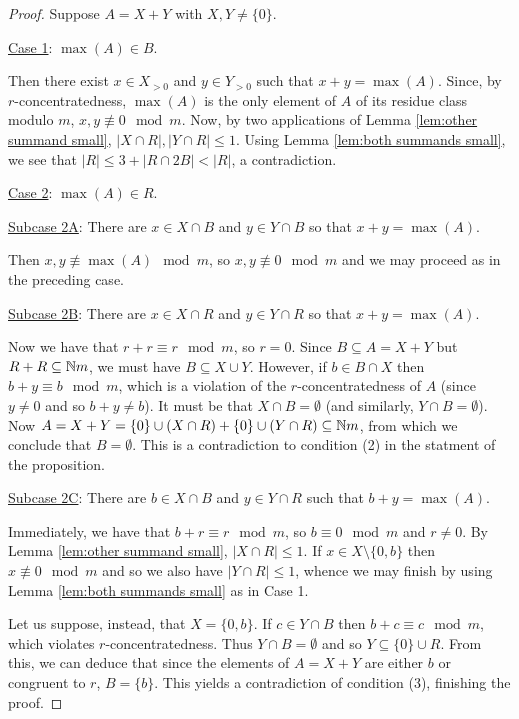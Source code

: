 \begin{proof}
Suppose $A = X + Y$ with $X,Y\neq\{0\}$.

\noindent \underline{Case 1}: $\max(A)\in B$.

Then there exist $x\in X_{>0}$ and $y\in Y_{>0}$ such that $x+y = \max(A)$.
Since, by $r$-concentratedness, $\max(A)$ is the only element of $A$ of its residue class modulo $m$, $x,y\not\equiv 0 \mod m$.
Now, by two applications of Lemma \ref{lem:other summand small}, $|X\cap R|, |Y\cap R|\le 1$.
Using Lemma \ref{lem:both summands small}, we see that $|R| \le 3 + |R\cap 2B| < |R|$, a contradiction.

\noindent \underline{Case 2}: $\max(A) \in R$.

\noindent \underline{Subcase 2A}: There are $x\in X\cap B$ and $y\in Y\cap B$ so that $x+y = \max(A)$.

Then $x,y\not\equiv \max(A) \mod m$, so $x,y\not\equiv 0 \mod m$ and we may proceed as in the preceding case.

\noindent \underline{Subcase 2B}: There are $x\in X\cap R$ and $y\in Y\cap R$ so that $x+y = \max(A)$.

Now we have that $r+r\equiv r \mod m$, so $r = 0$.
Since $B\subseteq A = X+Y$ but $R+R \subseteq \mathbb{N} m$, we must have $B \subseteq X \cup Y$.
However, if $b\in B\cap X$ then $b+y \equiv b \mod m$, which is a violation of the $r$-concentratedness of $A$ (since $y\neq 0$ and so $b+y\neq b$).
It must be that $X\cap B = \emptyset$ (and similarly, $Y\cap B = \emptyset$).
Now $A = X+Y = \{0\}\cup (X\cap R) + \{0\}\cup (Y\cap R) \subseteq \mathbb{N} m$, from which we conclude that $B = \emptyset$.
This is a contradiction to condition (2) in the statment of the proposition.

\noindent \underline{Subcase 2C}: There are $b\in X\cap B$ and $y\in Y\cap R$ such that $b + y = \max(A)$.

Immediately, we have that $b + r \equiv r \mod m$, so $b \equiv 0 \mod m$ and $r \neq 0$.
By Lemma \ref{lem:other summand small}, $|X\cap R| \le 1$.
If $x\in X\setminus \{0,b\}$ then $x\not\equiv 0\mod m$ and so we also have $|Y\cap R| \le 1$, whence we may finish by using Lemma \ref{lem:both summands small} as in Case 1.

Let us suppose, instead, that $X = \{0,b\}$.
If $c\in Y\cap B$ then $b+c \equiv c \mod m$, which violates $r$-concentratedness.
Thus $Y\cap B = \emptyset$ and so $Y\subseteq \{0\}\cup R$.
From this, we can deduce that since the elements of $A = X+Y$ are either $b$ or congruent to $r$, $B = \{b\}$.
This yields a contradiction of condition (3), finishing the proof.
\end{proof}

